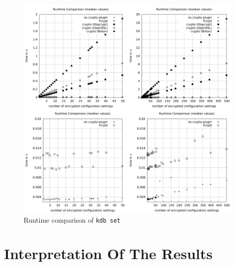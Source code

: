 \begin{figure}[h]
\center
\caption{Runtime comparison of \texttt{kdb set}}
\label{eval-runtime-comp-set}
\includegraphics[width=\columnwidth]{plots/comp_median_set.pdf}
\end{figure}





\section{Interpretation Of The Results}



